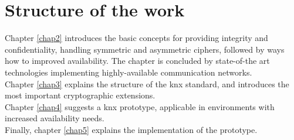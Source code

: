 \section{Structure of the work}

Chapter \ref{chap2} introduces the basic concepts for providing integrity and confidentiality, handling symmetric and asymmetric ciphers, followed by ways how to improved availability.
The chapter is concluded by state-of-the art technologies implementing highly-available communication networks.
\\
Chapter \ref{chap3} explains the structure of the \gls{knx} standard, and introduces the most important cryptographic extensions.
\\
Chapter \ref{chap4} suggests a \gls{knx} prototype, applicable in environments with increased availability needs.
\\
Finally, chapter \ref{chap5} explains the implementation of the prototype.



